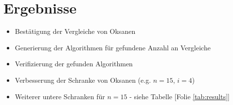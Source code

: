 \section{Ergebnisse}

\begin{frame}{\insertsection}
  \begin{itemize}
    \item<+-> Bestätigung der Vergleiche von Oksanen
    \item<+-> Generierung der Algorithmen für gefundene Anzahl an Vergleiche
    \item<+-> Verifizierung der gefunden Algorithmen
    \item<+-> Verbesserung der Schranke von Oksanen (e.g. $n=15$, $i=4$)
    \item<+-> Weiterer untere Schranken für $n=15$ - siehe Tabelle [Folie \ref{tab:results}]
  \end{itemize}


\end{frame}

